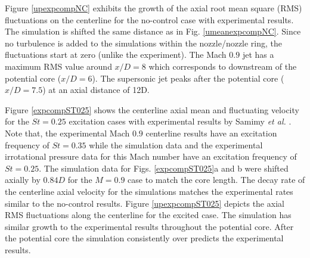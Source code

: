 \documentclass[english]{aiaa-tc}
\begin{document}
Figure \ref{upexpcompNC} exhibits the growth of the axial root mean square (RMS) fluctuations on the centerline for the no-control case with experimental results. The simulation is shifted the same distance as in Fig. \ref{umeanexpcompNC}. Since no turbulence is added to the simulations within the nozzle/nozzle ring, the fluctuations start at zero (unlike the experiment). The Mach $0.9$ jet has a maximum RMS value around $x/D=8$ which corresponds to downstream of the potential core ($x/D=6$). The supersonic jet peaks after the potential core ($x/D=7.5$) at an axial distance of 12D. 

Figure \ref{expcompST025} shows the centerline axial mean and fluctuating velocity for the $St=0.25$ excitation cases with experimental results by Samimy {\em et al.} \cite{sm2007-2,kearney2013intermittent}. Note that, the experimental Mach $0.9$ centerline results have an excitation frequency of $St=0.35$ while the simulation data and the experimental irrotational pressure data for this Mach number have an excitation frequency of $St=0.25$. The simulation data for Figs. \ref{expcompST025}a and b were shifted axially by $0.84D$ for the $M=0.9$ case to match the core length. The decay rate of the centerline axial velocity for the simulations matches the experimental rates similar to the no-control results.  Figure \ref{upexpcompST025} depicts the axial RMS fluctuations along the centerline for the excited case. The simulation has similar growth to the experimental results throughout the potential core. After the potential core the simulation consistently over predicts the experimental results.
\end{document}
